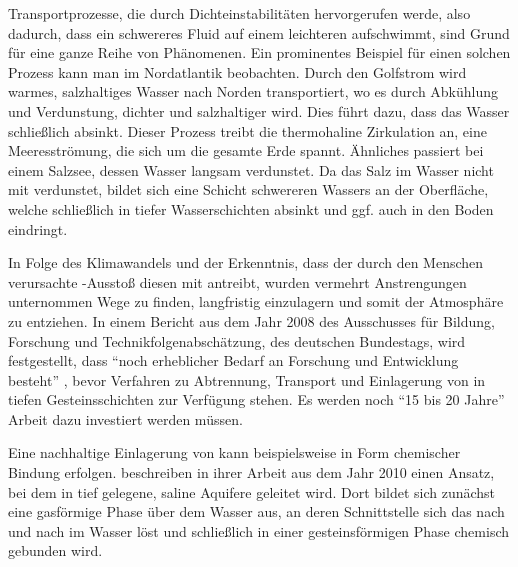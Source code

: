 
\label{cha:intro}


Transportprozesse, die durch Dichteinstabilitäten hervorgerufen werde, also dadurch, dass ein schwereres Fluid auf einem leichteren aufschwimmt, sind Grund für eine ganze Reihe von Phänomenen.
Ein prominentes Beispiel für einen solchen Prozess kann man im Nordatlantik beobachten. Durch den Golfstrom wird warmes, salzhaltiges Wasser nach Norden transportiert, wo es durch Abkühlung und Verdunstung, dichter und salzhaltiger wird. Dies führt dazu, dass das Wasser schließlich absinkt. Dieser Prozess treibt die thermohaline Zirkulation an, eine Meeresströmung, die sich um die gesamte Erde spannt. 
Ähnliches passiert bei einem Salzsee, dessen Wasser langsam verdunstet. Da das Salz im Wasser nicht mit verdunstet, bildet sich eine Schicht schwereren Wassers an der Oberfläche, welche schließlich in tiefer Wasserschichten absinkt und ggf. auch in den Boden eindringt.

In Folge des Klimawandels und der Erkenntnis, dass der durch den Menschen verursachte \COT-Ausstoß diesen mit antreibt, wurden vermehrt Anstrengungen unternommen Wege zu finden, \COT langfristig einzulagern und somit der Atmosphäre zu entziehen. 
In einem Bericht aus dem Jahr 2008 des Ausschusses für Bildung, Forschung und Technikfolgenabschätzung, des deutschen Bundestags, wird festgestellt, dass ``noch erheblicher Bedarf an Forschung und Entwicklung besteht'' \citep{taccs}, bevor Verfahren zu Abtrennung, Transport und Einlagerung von \COT in tiefen Gesteinsschichten zur Verfügung stehen. Es werden noch ``15 bis 20 Jahre'' Arbeit dazu investiert werden müssen.

Eine nachhaltige Einlagerung von \COT kann beispielsweise in Form chemischer Bindung erfolgen. \cite{kneafsy} beschreiben in ihrer Arbeit aus dem Jahr 2010 einen Ansatz, bei dem \COT in tief gelegene, saline Aquifere geleitet wird. Dort bildet sich zunächst eine gasförmige Phase über dem Wasser aus, an deren Schnittstelle sich das \COT nach und nach im Wasser löst und schließlich in einer gesteinsförmigen Phase chemisch gebunden wird. 

